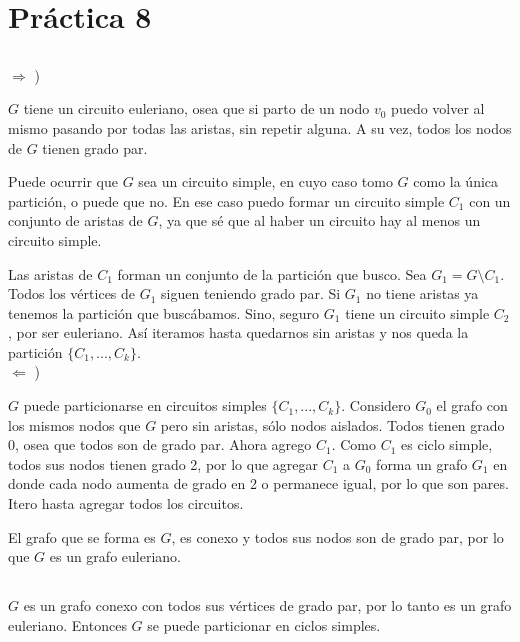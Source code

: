 \section{Práctica 8}

\setcounter{subsection}{3}
\subsection{}

$\Longrightarrow$ )

$G$ tiene un circuito euleriano, osea que si parto de un nodo $v_0$ puedo volver al mismo pasando por todas las aristas, sin repetir alguna. A su vez, todos los nodos de $G$ tienen grado par.

Puede ocurrir que $G$ sea un circuito simple, en cuyo caso tomo $G$ como la única partición, o puede que no. En ese caso puedo formar un circuito simple $C_1$ con un conjunto de aristas de $G$, ya que sé que al haber un circuito hay al menos un circuito simple.

Las aristas de $C_1$ forman un conjunto de la partición que busco. Sea $G_1 = G \setminus C_1$. Todos los vértices de $G_1$ siguen teniendo grado par. Si $G_1$ no tiene aristas ya tenemos la partición que buscábamos. Sino, seguro $G_1$ tiene un circuito simple $C_2$, por ser euleriano. Así iteramos hasta quedarnos sin aristas y nos queda la partición $\{C_1, ..., C_k\}$. \\

$\Longleftarrow$ )

$G$ puede particionarse en circuitos simples $\{C_1, ..., C_k\}$. Considero $G_0$ el grafo con los mismos nodos que $G$ pero sin aristas, sólo nodos aislados. Todos tienen grado 0, osea que todos son de grado par. Ahora agrego $C_1$. Como $C_1$ es ciclo simple, todos sus nodos tienen grado 2, por lo que agregar $C_1$ a $G_0$ forma un grafo $G_1$ en donde cada nodo aumenta de grado en 2 o permanece igual, por lo que son pares. Itero hasta agregar todos los circuitos.

El grafo que se forma es $G$, es conexo y todos sus nodos son de grado par, por lo que $G$ es un grafo euleriano.

\subsection{}

$G$ es un grafo conexo con todos sus vértices de grado par, por lo tanto es un grafo euleriano. Entonces $G$ se puede particionar en ciclos simples.

